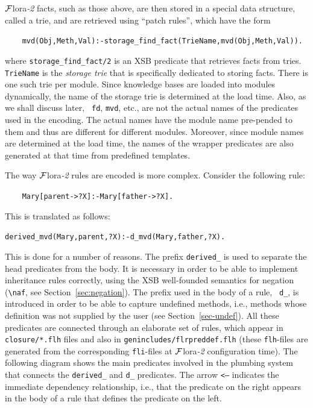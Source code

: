 \documentclass[11pt]{article}
\newcommand{\FLORA}{{\mbox{\sc ${\cal F}${lora}\rm\emph{-2}}}\xspace}
\newcommand{\FLSYSTEM}{\FLORA}
\newcommand{\bs}{\textbackslash}
\newcommand{\RULELOGNAF}{{\texttt{{\bs}naf}}\xspace}
\begin{document}
{\FLSYSTEM facts, such as those above, are then stored in a special data structure,
called a {\rm trie}, and are retrieved using  ``patch rules'', which have the
form
\begin{alltt}
~~~~ mvd(Obj,Meth,Val) :- storage\_find\_fact(TrieName, mvd(Obj,Meth,Val)).  
\end{alltt}
where {\tt storage\_find\_fact/2} is an XSB predicate that retrieves facts
from tries. {\tt TrieName} is the \emph{storage trie} that is specifically
dedicated to storing facts. There is one such trie per module. Since
knowledge bases are loaded into modules dynamically, the name of the storage trie
is determined at the load time. Also, as we shall discuss later, {\tt
  fd}, {\tt mvd}, etc., are not the actual names of the predicates used in
the encoding. The actual names have the module name pre-pended to them and
thus are different for different modules. Moreover, since module names are
determined at the load time, the names of the wrapper predicates are
also generated at that time from predefined templates.

The way \FLSYSTEM rules are encoded is more complex. Consider the following rule:
\begin{alltt}
~~~~Mary[parent->?X] :- Mary[father->?X].  
\end{alltt}
This is translated as follows:
\begin{alltt}
 derived\_mvd(Mary,parent,?X) :- d\_mvd(Mary,father,?X).  
\end{alltt}
This is done for a number of reasons. The prefix {\tt derived\_} is used to
separate the head predicates from the body. It is necessary in order to
be able to implement inheritance rules correctly, using the XSB
well-founded semantics for negation (\RULELOGNAF, see
Section~\ref{sec:negation}). The prefix used in the body of a rule, {\tt
  d\_}, is introduced in order to be able to capture undefined methods,
i.e., methods whose definition was not supplied by the user (see
Section~\ref{sec-undef}). All these predicates are connected through an
elaborate set of rules, which appear in {\tt closure/*.flh} files and also
in {\tt genincludes/flrpreddef.flh} (these {\tt flh}-files are generated
from the corresponding {\tt fli}-files at \FLSYSTEM configuration time).
The following diagram shows the main
predicates involved in the plumbing system that connects
the {\tt derived\_} and {\tt d\_} predicates. The arrow {\tt <---} indicates the
immediate dependency relationship, i.e., that the predicate on the
right appears in the body of a rule that defines the predicate on the left.

}
\end{document}
